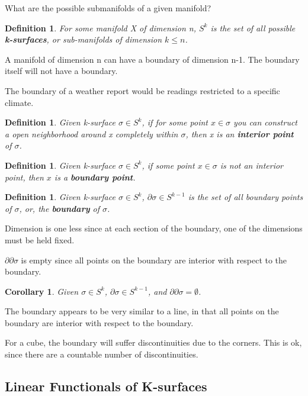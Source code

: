 \documentclass{book}
\newtheorem{defn}[equation]{Definition}
\newtheorem{coro}[equation]{Corollary}
\begin{document}
What are the possible submanifolds of a given manifold?


\begin{defn}
	For some manifold X of dimension n, $S^k$ is the set of all possible \textbf{k-surfaces}, or sub-manifolds of dimension $k \leq n$. 
\end{defn}

A manifold of dimension n can have a boundary of dimension n-1. The boundary itself will not have a boundary.

The boundary of a weather report would be readings restricted to a specific climate. 


\begin{defn}
	Given k-surface $\sigma \in S^k$, if for some point $x \in \sigma$ you can construct a open neighborhood around x completely within $\sigma$, then x is an \textbf{interior point} of $\sigma$. 
\end{defn}

\begin{defn}
	Given k-surface $\sigma \in S^k$, if some point $x \in \sigma$ is not an interior point, then $x$ is a \textbf{boundary point}.
\end{defn}

\begin{defn}
	Given k-surface $\sigma \in S^k$, $\partial\sigma \in S^{k-1}$ is the set of all boundary points of $\sigma$, or, the \textbf{boundary} of $\sigma$. 
\end{defn}

Dimension is one less since at each section of the boundary, one of the dimensions must be held fixed.

$\partial\partial\sigma$ is empty since all points on the boundary are interior with respect to the boundary.


\begin{coro}
	Given $\sigma \in S^k$, $\partial\sigma \in S^{k-1}$, and $\partial\partial\sigma = \emptyset$. 
\end{coro}


The boundary appears to be very similar to a line, in that all points on the boundary are interior with respect to the boundary. 

For a cube, the boundary will suffer discontinuities due to the corners. This is ok, since there are a countable number of discontinuities. 

\subsection{Linear Functionals of K-surfaces}
\end{document}
